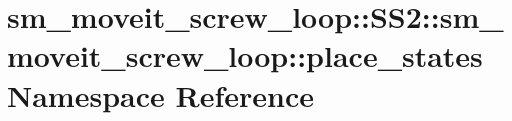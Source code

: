 \hypertarget{namespacesm__moveit__screw__loop_1_1SS2_1_1sm__moveit__screw__loop_1_1place__states}{}\section{sm\+\_\+moveit\+\_\+screw\+\_\+loop\+:\+:S\+S2\+:\+:sm\+\_\+moveit\+\_\+screw\+\_\+loop\+:\+:place\+\_\+states Namespace Reference}
\label{namespacesm__moveit__screw__loop_1_1SS2_1_1sm__moveit__screw__loop_1_1place__states}

